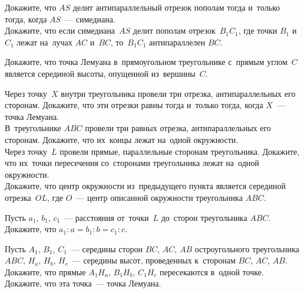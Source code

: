 \begin{problems}

\item
\subproblem
Докажите, что $AS$ делит антипараллельный отрезок пополам тогда и~только тогда,
когда $AS$~--- симедиана.
\\
\subproblem
Докажите, что если симедиана~$AS$ делит пополам отрезок~$B_1 C_1$, где точки
$B_1$ и~$C_1$ лежат на~лучах $AC$ и~$BC$, то~$B_1 C_1$ антипараллелен $BC$.

\item
Докажите, что точка Лемуана в~прямоугольном треугольнике с~прямым углом~$C$
является серединой высоты, опущенной из~вершины~$C$.

\item
\subproblem
Через точку~$X$ внутри треугольника провели три отрезка, антипараллельных
его сторонам.
Докажите, что эти отрезки равны тогда и~только тогда, когда $X$~---
точка Лемуана.
\\
\subproblem
В~треугольнике $ABC$ провели три равных отрезка, антипараллельных его
сторонам.
Докажите, что их~концы лежат на~одной окружности.
\\
\subproblem
Через точку~$L$ провели прямые, параллельные сторонам треугольника.
Докажите, что их~точки пересечения со~сторонами треугольника лежат на~одной
окружности.
\\
\subproblem
Докажите, что центр окружности из~предыдущего пункта является серединой
отрезка~$OL$, где $O$~--- центр описанной окружности треугольника $ABC$.

\item
Пусть $a_1$, $b_1$, $c_1$~--- расстояния от~точки~$L$ до~сторон
треугольника $ABC$.
Докажите, что
\(
    a_1 : a
=
    b_1 : b
=
    c_1 : c
\).


\item
\subproblem
Пусть $A_1$, $B_1$, $C_1$~--- середины сторон $BC$, $AC$, $AB$ остроугольного
треугольника $ABC$, $H_{a}$, $H_{b}$, $H_{c}$~--- середины высот, проведенных
к~сторонам $BC$, $AC$, $AB$.
Докажите, что прямые $A_1 H_{a}$, $B_1 H_{b}$, $C_1 H_{c}$ пересекаются
в~одной точке.
\\
\subproblem
Докажите, что эта точка~--- точка Лемуана.

\end{problems}

